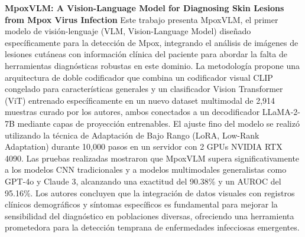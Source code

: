 \documentclass[11pt, a4paper]{article}
\begin{document}
\textbf{MpoxVLM: A Vision-Language Model for Diagnosing Skin Lesions from Mpox Virus Infection} \cite{cao_mpoxvlm_2024}
Este trabajo presenta MpoxVLM, el primer modelo de visión-lenguaje (VLM, Vision-Language Model) diseñado específicamente para la detección de Mpox, integrando el análisis de imágenes de lesiones cutáneas con información
clínica del paciente para abordar la falta de herramientas diagnósticas robustas en este dominio. La metodología propone una arquitectura de doble codificador que combina un codificador visual CLIP congelado para 
características generales y un clasificador Vision Transformer (ViT) entrenado específicamente en un nuevo dataset multimodal de 2,914 muestras curado por los autores, ambos conectados a un decodificador LLaMA-2-7B mediante
capas de proyección entrenables. El ajuste fino del modelo se realizó utilizando la técnica de Adaptación de Bajo Rango (LoRA, Low-Rank Adaptation) durante 10,000 pasos en un servidor con 2 GPUs NVIDIA RTX 4090. Las pruebas
realizadas mostraron que MpoxVLM supera significativamente a los modelos CNN tradicionales y a modelos multimodales generalistas como GPT-4o y Claude 3, alcanzando una exactitud del 90.38\% y un AUROC del 95.16\%. Los 
autores concluyen que la integración de datos visuales con registros clínicos demográficos y síntomas específicos es fundamental para mejorar la sensibilidad del diagnóstico en poblaciones diversas, ofreciendo una herramienta
prometedora para la detección temprana de enfermedades infecciosas emergentes.
\end{document}

